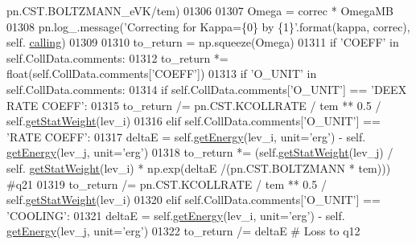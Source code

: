 \begin{DoxyCode}
{{      pn.CST.BOLTZMANN\_eVK/tem)
01306     
01307                 Omega = correc * OmegaMB
01308                 pn.log\_.message(\textcolor{stringliteral}{'Correcting for Kappa=\{0\} by \{1\}'}.format(kappa, correc), self.
      \hyperlink{classpyneb_1_1core_1_1pynebcore_1_1_atom_a373b7735acf4f528b54bddf373ad67a1}{calling})
01309 
01310             to\_return = np.squeeze(Omega)
01311         \textcolor{keywordflow}{if} \textcolor{stringliteral}{'COEFF'} \textcolor{keywordflow}{in} self.CollData.comments:
01312             to\_return *= float(self.CollData.comments[\textcolor{stringliteral}{'COEFF'}])
01313         \textcolor{keywordflow}{if} \textcolor{stringliteral}{'O\_UNIT'} \textcolor{keywordflow}{in} self.CollData.comments:
01314             \textcolor{keywordflow}{if} self.CollData.comments[\textcolor{stringliteral}{'O\_UNIT'}] == \textcolor{stringliteral}{'DEEX RATE COEFF'}:
01315                 to\_return /= pn.CST.KCOLLRATE / tem ** 0.5 / self.\hyperlink{classpyneb_1_1core_1_1pynebcore_1_1_atom_a0f2483487115f19556586b9e422bd5fb}{getStatWeight}(lev\_i)
01316             \textcolor{keywordflow}{elif} self.CollData.comments[\textcolor{stringliteral}{'O\_UNIT'}] == \textcolor{stringliteral}{'RATE COEFF'}:
01317                 deltaE = self.\hyperlink{classpyneb_1_1core_1_1pynebcore_1_1_atom_a9940acb2999e864edf9761d822e65d7f}{getEnergy}(lev\_i, unit=\textcolor{stringliteral}{'erg'}) - self.
      \hyperlink{classpyneb_1_1core_1_1pynebcore_1_1_atom_a9940acb2999e864edf9761d822e65d7f}{getEnergy}(lev\_j, unit=\textcolor{stringliteral}{'erg'})
01318                 to\_return *= (self.\hyperlink{classpyneb_1_1core_1_1pynebcore_1_1_atom_a0f2483487115f19556586b9e422bd5fb}{getStatWeight}(lev\_j) / self.
      \hyperlink{classpyneb_1_1core_1_1pynebcore_1_1_atom_a0f2483487115f19556586b9e422bd5fb}{getStatWeight}(lev\_i) * np.exp(deltaE /(pn.CST.BOLTZMANN * tem))) \textcolor{comment}{#q21}
01319                 to\_return /= pn.CST.KCOLLRATE / tem ** 0.5 / self.\hyperlink{classpyneb_1_1core_1_1pynebcore_1_1_atom_a0f2483487115f19556586b9e422bd5fb}{getStatWeight}(lev\_i)
01320             \textcolor{keywordflow}{elif} self.CollData.comments[\textcolor{stringliteral}{'O\_UNIT'}] == \textcolor{stringliteral}{'COOLING'}:
01321                 deltaE = self.\hyperlink{classpyneb_1_1core_1_1pynebcore_1_1_atom_a9940acb2999e864edf9761d822e65d7f}{getEnergy}(lev\_i, unit=\textcolor{stringliteral}{'erg'}) - self.
      \hyperlink{classpyneb_1_1core_1_1pynebcore_1_1_atom_a9940acb2999e864edf9761d822e65d7f}{getEnergy}(lev\_j, unit=\textcolor{stringliteral}{'erg'})
01322                 to\_return /= deltaE \textcolor{comment}{# Loss to q12                }
}}
\end{DoxyCode}
